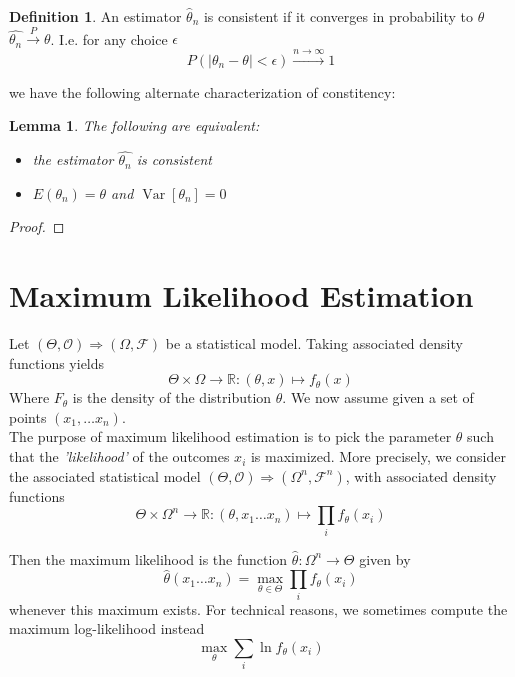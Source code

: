 \documentclass{book}
\theoremstyle{plain}
\newtheorem{lemma}[corollary]{Lemma}
\theoremstyle{definition}
\newtheorem{definition}[corollary]{Definition}
\renewcommand{\d}[1]{\mathbb{#1}}
\newcommand{\fun}{\mapsto}
\newcommand{\mor}{\longrightarrow}
\renewcommand{\r}[1]{\mathcal{#1}}
\DeclareMathOperator{\Var}{Var}
\begin{document}
\begin{definition}
An estimator $\hat{\theta}_n$ is consistent if it converges in probability to $\theta$ $\hat{\theta_n}\stackrel{P}{\mor} \theta$. I.e. for any choice $\epsilon$
\[
P(\vert \theta_n-\theta\vert <\epsilon)\stackrel{n\to \infty}{\mor} 1
\]
\end{definition}

we have the following alternate characterization of constitency:

\begin{lemma}
The following are equivalent:
\begin{itemize}
\item the estimator $\hat{\theta_n}$ is consistent
\item $E(\theta_n)=\theta$ and $\Var[\theta_n]=0$	
\end{itemize}
\end{lemma}

\begin{proof}
	
\end{proof}
 
 
\section{Maximum Likelihood Estimation}
Let $(\Theta, \r{O})\Longrightarrow (\Omega, \r{F})$ be a statistical model. Taking associated density functions yields
\[
\Theta\times \Omega \mor \d{R}:(\theta,x)\fun f_\theta(x)
\]
Where $F_\theta$ is the density of the distribution $\theta$. We now assume given a set of points $(x_1,\ldots x_n)$.\\ The purpose of maximum likelihood estimation is to pick the parameter $\theta$ such that the \emph{'likelihood'} of the outcomes $x_i$ is maximized. More precisely, we consider the associated statistical model $(\Theta,\r{O})\Longrightarrow (\Omega^n,\r{F}^n)$, with associated density functions
\[
\Theta\times \Omega^n\mor \d{R}:(\theta,x_1\ldots x_n)\fun \prod_i f_\theta(x_i)
\]


Then the maximum likelihood is the function $\hat{\theta}:\Omega^n\mor \Theta$ given by
\[
\hat{\theta}(x_1\ldots x_n)=\max_{\theta\in \Theta} \prod_i f_\theta(x_i)
\]
whenever this maximum exists. For technical reasons, we sometimes compute the maximum  log-likelihood instead
\[
\max_\theta \sum_i \ln f_\theta(x_i)
\]
\end{document}
